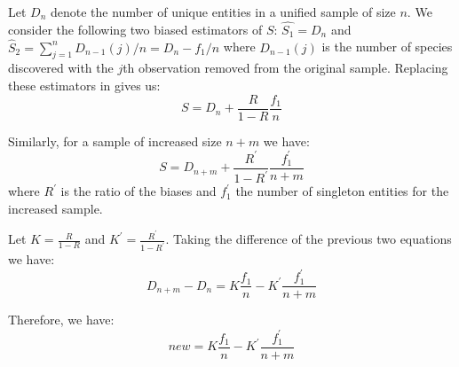 Let $D_n$ denote the number of unique entities in a unified sample of size $n$. We consider the following two biased estimators of $S$: $\hat{S_1} = D_n$ and $\hat{S}_2 = \sum_{j=1}^n D_{n-1}(j)/n = D_n - f_1/n$ where $D_{n-1}(j)$ is the number of species discovered with the $j$th observation removed from the original sample. Replacing these estimators in  gives us:
\begin{equation}
S = D_n +\frac{R}{1-R}\frac{f_1}{n}
\end{equation}

Similarly, for a sample of increased size $n+m$ we have:
\begin{equation}
S = D_{n+m} +\frac{R^{\prime}}{1-R^{\prime}}\frac{f^{\prime}_1}{n+m}
\end{equation}
where $R^{\prime}$ is the ratio of the biases and $f^{\prime}_1$ the number of singleton entities for the increased sample.

Let $K = \frac{R}{1-R}$ and $K^{\prime} = \frac{R^{\prime}}{1-R^{\prime}}$. Taking the difference of the previous two equations we have:
\begin{equation}
D_{n+m} - D_{n} = K\frac{f_1}{n} - K^{\prime}\frac{f^{\prime}_1}{n+m}
\end{equation}

Therefore, we have:
\begin{equation}
\label{eq:new}
new = K\frac{f_1}{n} - K^{\prime}\frac{f^{\prime}_1}{n+m}
\end{equation}


